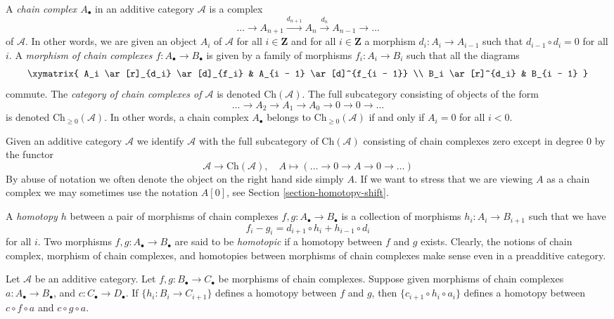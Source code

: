 \medskip\noindent
A {\it chain complex $A_\bullet$} in an additive category $\mathcal{A}$
is a complex
$$
\ldots \to
A_{n + 1} \xrightarrow{d_{n + 1}}
A_n \xrightarrow{d_n}
A_{n - 1} \to
\ldots
$$
of $\mathcal{A}$. In other words, we are given an object $A_i$ of
$\mathcal{A}$ for all $i \in \mathbf{Z}$ and for
all $i \in \mathbf{Z}$ a morphism $d_i : A_i \to A_{i - 1}$ such that
$d_{i - 1} \circ d_i = 0$ for all $i$. A {\it morphism of chain
complexes $f : A_\bullet \to B_\bullet$} is given by a
family of morphisms $f_i : A_i \to B_i$ such that all
the diagrams
$$
\xymatrix{
A_i \ar[r]_{d_i} \ar[d]_{f_i} & A_{i - 1} \ar[d]^{f_{i - 1}} \\
B_i \ar[r]^{d_i} & B_{i - 1}
}
$$
commute. The {\it category of chain complexes of $\mathcal{A}$}
is denoted $\text{Ch}(\mathcal{A})$. The full subcategory consisting
of objects of the form
$$
\ldots \to A_2 \to A_1 \to A_0 \to 0 \to 0 \to \ldots
$$
is denoted $\text{Ch}_{\geq 0}(\mathcal{A})$.
In other words, a chain complex $A_\bullet$ belongs to
$\text{Ch}_{\geq 0}(\mathcal{A})$ if and only if
$A_i = 0$ for all $i < 0$.

\medskip\noindent
Given an additive category $\mathcal{A}$ we identify $\mathcal{A}$
with the full subcategory of $\text{Ch}(\mathcal{A})$ consisting
of chain complexes zero except in degree $0$ by the functor
$$
\mathcal{A} \longrightarrow \text{Ch}(\mathcal{A}),\quad
A \longmapsto (\ldots \to 0 \to A \to 0 \to \ldots)
$$
By abuse of notation we often denote the object on the right hand side
simply $A$. If we want to stress that we are viewing $A$ as a chain
complex we may sometimes use the notation $A[0]$, see
Section \ref{section-homotopy-shift}.

\medskip\noindent
A {\it homotopy $h$} between a pair of morphisms
of chain complexes $f, g : A_\bullet \to B_\bullet$
is a collection of morphisms $h_i : A_i \to B_{i + 1}$
such that we have
$$
f_i - g_i = d_{i + 1} \circ h_i + h_{i - 1} \circ d_i
$$
for all $i$.
Two morphisms $f, g : A_\bullet \to B_\bullet$ are
said to be {\it homotopic} if a homotopy between $f$
and $g$ exists.
Clearly, the notions of chain complex, morphism of
chain complexes, and homotopies between morphisms of chain complexes
make sense even in a preadditive category.

\begin{lemma}
\label{lemma-compose-homotopy}
Let $\mathcal{A}$ be an additive category.
Let $f, g : B_\bullet \to C_\bullet$ be morphisms
of chain complexes. Suppose given morphisms of chain
complexes $a : A_\bullet \to B_\bullet$, and
$c : C_\bullet \to D_\bullet$.
If $\{h_i : B_i \to C_{i + 1}\}$ defines a homotopy
between $f$ and $g$, then $\{c_{i + 1} \circ h_i \circ a_i\}$
defines a homotopy between $c \circ f \circ a$ and
$c \circ g \circ a$.
\end{lemma}

